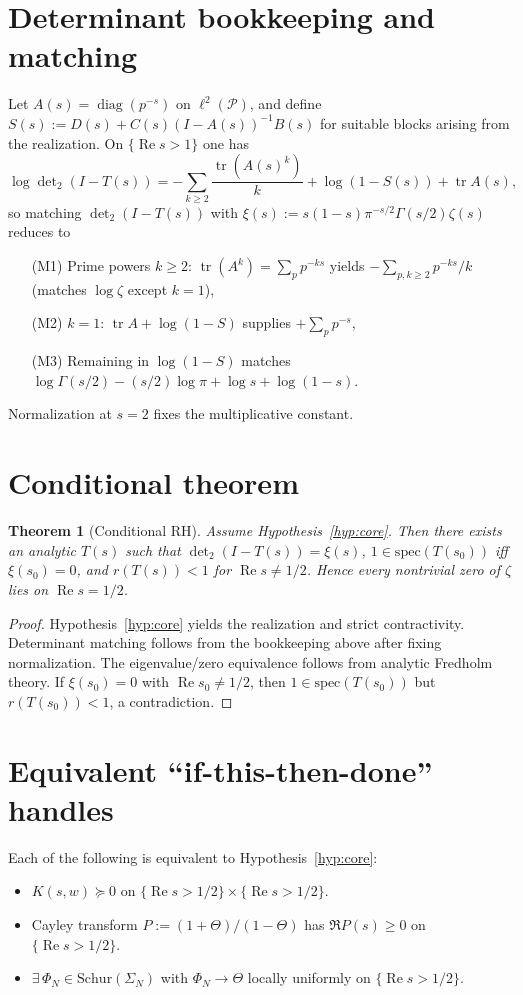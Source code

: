 \documentclass[11pt]{article}
\newcommand{\Pset}{\mathcal{P}}
\newcommand{\ReS}{\operatorname{Re}}
\newcommand{\spec}{\mathrm{spec}}
\newcommand{\Th}{\Theta}
\newcommand{\SiN}{\Sigma_N}
\newcommand{\detTwo}{\det\nolimits_{2}}
\newcommand{\xiFun}{\xi}
\newcommand{\Hhp}{\{\ReS s>1/2\}}
\theoremstyle{plain}
\newtheorem{theorem}{Theorem}
\theoremstyle{definition}
\theoremstyle{remark}
\begin{document}
\section{Determinant bookkeeping and matching}
Let $A(s)=\operatorname{diag}(p^{-s})$ on $\ell^2(\Pset)$, and define $S(s):=D(s)+C(s)(I-A(s))^{-1}B(s)$ for suitable blocks arising from the realization. On $\{\ReS s>1\}$ one has
\[
\log\detTwo(I-T(s)) = -\sum_{k\ge 2}\frac{\operatorname{tr}(A(s)^k)}{k} + \log(1 - S(s)) + \operatorname{tr}A(s),
\]
so matching $\detTwo(I-T(s))$ with $\xiFun(s):=s(1-s)\pi^{-s/2}\Gamma(s/2)\zeta(s)$ reduces to
\begin{itemize}
  \item[(M1)] Prime powers $k\ge 2$: $\operatorname{tr}(A^k)=\sum_p p^{-ks}$ yields $-\sum_{p,k\ge2}p^{-ks}/k$ (matches $\log\zeta$ except $k=1$),
  \item[(M2)] $k=1$: $\operatorname{tr}A + \log(1-S)$ supplies $+\sum_p p^{-s}$,
  \item[(M3)] Remaining in $\log(1-S)$ matches $\log\Gamma(s/2) - (s/2)\log\pi + \log s + \log(1-s)$.
\end{itemize}
Normalization at $s=2$ fixes the multiplicative constant.

\section{Conditional theorem}
\begin{theorem}[Conditional RH]
Assume Hypothesis~\ref{hyp:core}. Then there exists an analytic $T(s)$ such that $\detTwo(I-T(s))=\xiFun(s)$, $1\in\spec(T(s_0))$ iff $\xiFun(s_0)=0$, and $r(T(s))<1$ for $\ReS s\ne 1/2$. Hence every nontrivial zero of $\zeta$ lies on $\ReS s=1/2$.
\end{theorem}
\begin{proof}
Hypothesis~\ref{hyp:core} yields the realization and strict contractivity. Determinant matching follows from the bookkeeping above after fixing normalization. The eigenvalue/zero equivalence follows from analytic Fredholm theory. If $\xiFun(s_0)=0$ with $\ReS s_0\ne 1/2$, then $1\in\spec(T(s_0))$ but $r(T(s_0))<1$, a contradiction.
\end{proof}

\section{Equivalent “if-this-then-done” handles}
Each of the following is equivalent to Hypothesis~\ref{hyp:core}:
\begin{itemize}
  \item $K(s,w)\succeq 0$ on $\Hhp\times\Hhp$.
  \item Cayley transform $P:=(1+\Th)/(1-\Th)$ has $\Re P(s)\ge 0$ on $\Hhp$.
  \item $\exists\,\Phi_N\in\mathrm{Schur}(\SiN)$ with $\Phi_N\to\Th$ locally uniformly on $\Hhp$.
\end{itemize}
\end{document}
